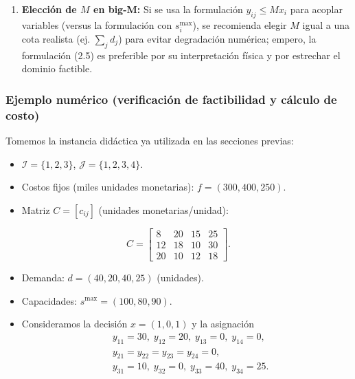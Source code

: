 \documentclass[
  spanish,
  us-letterpaper,
  DIV=11,
  numbers=noendperiod]{scrreprt}
\providecommand{\tightlist}{%
  \setlength{\itemsep}{0pt}\setlength{\parskip}{0pt}}
\numberwithin{equation}{section}
\begin{document}
\begin{enumerate}
\def\labelenumi{\arabic{enumi}.}
\setcounter{enumi}{2}
\tightlist
\item
  \textbf{Elección de \(M\) en big-M:} Si se usa la formulación
  \(y_{ij}\le M x_i\) para acoplar variables (versus la formulación con
  \(s_i^{\max}\)), se recomienda elegir \(M\) igual a una cota realista
  (ej. \(\sum_j d_j\)) para evitar degradación numérica; empero, la
  formulación (2.5) es preferible por su interpretación física y por
  estrechar el dominio factible.
\end{enumerate}

\subsubsection{Ejemplo numérico (verificación de factibilidad y cálculo
de
costo)}\label{ejemplo-numuxe9rico-verificaciuxf3n-de-factibilidad-y-cuxe1lculo-de-costo}

Tomemos la instancia didáctica ya utilizada en las secciones previas:

\begin{itemize}
\tightlist
\item
  \(\mathcal{I}=\{1,2,3\}\), \(\mathcal{J}=\{1,2,3,4\}\).
\item
  Costos fijos (miles unidades monetarias): \(f=(300,400,250)\).
\item
  Matriz \(C=[c_{ij}]\) (unidades monetarias/unidad):
\end{itemize}

\[
C=
\begin{bmatrix}
8 & 20 & 15 & 25 \\
12 & 18 & 10 & 30 \\
20 & 10 & 12 & 18
\end{bmatrix}.
\]

\begin{itemize}
\tightlist
\item
  Demanda: \(d=(40,20,40,25)\) (unidades).
\item
  Capacidades: \(s^{\max}=(100,80,90)\).
\item
  Consideramos la decisión \(x=(1,0,1)\) y la asignación \[
  \begin{aligned}
  &y_{11}=30,\; y_{12}=20,\; y_{13}=0,\; y_{14}=0,\\
  &y_{21}=y_{22}=y_{23}=y_{24}=0,\\
  &y_{31}=10,\; y_{32}=0,\; y_{33}=40,\; y_{34}=25.
  \end{aligned}
  \]
\end{itemize}
\end{document}
